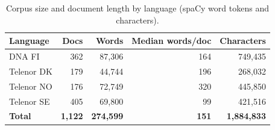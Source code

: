 \begin{table}[t]
\centering
\caption{Corpus size and document length by language (spaCy word tokens and characters).}
\label{tab:token_stats}
\begin{tabular}{lrrrr}
\toprule
\textbf{Language} & \textbf{Docs} & \textbf{Words} & \textbf{Median words/doc} & \textbf{Characters} \\
\midrule
DNA FI & 362 & 87{,}306 & 164 & 749{,}435 \\
Telenor DK & 179 & 44{,}744 & 196 & 268{,}032 \\
Telenor NO & 176 & 72{,}749 & 320 & 445{,}850 \\
Telenor SE & 405 & 69{,}800 & 99 & 421{,}516 \\
\midrule
\textbf{Total} & \textbf{1{,}122} & \textbf{274{,}599} & \textbf{151} & \textbf{1{,}884{,}833} \\
\bottomrule
\end{tabular}
\end{table}

